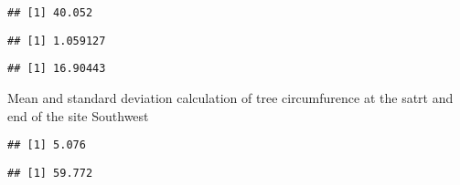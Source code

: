 \documentclass[]{article}
\newenvironment{Shaded}{\begin{snugshade}}{\end{snugshade}}
\newcommand{\DecValTok}[1]{\textcolor[rgb]{0.00,0.00,0.81}{#1}}
\newcommand{\KeywordTok}[1]{\textcolor[rgb]{0.13,0.29,0.53}{\textbf{#1}}}
\newcommand{\NormalTok}[1]{#1}
\newcommand{\OperatorTok}[1]{\textcolor[rgb]{0.81,0.36,0.00}{\textbf{#1}}}
\begin{document}
\begin{verbatim}
## [1] 40.052
\end{verbatim}

\begin{Shaded}
\end{Shaded}

\begin{verbatim}
## [1] 1.059127
\end{verbatim}

\begin{Shaded}
\end{Shaded}

\begin{verbatim}
## [1] 16.90443
\end{verbatim}

Mean and standard deviation calculation of tree circumfurence at the
satrt and end of the site Southwest

\begin{Shaded}
\end{Shaded}

\begin{verbatim}
## [1] 5.076
\end{verbatim}

\begin{Shaded}
\end{Shaded}

\begin{verbatim}
## [1] 59.772
\end{verbatim}

\begin{Shaded}
\end{Shaded}
\end{document}
